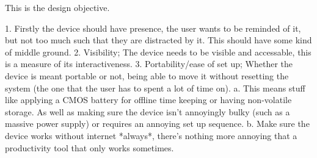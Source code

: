 This is the design objective.

1. Firstly the device should have presence, the user wants to be reminded of it, but not too much such that they are distracted by it. This should have some kind of middle ground.
2. Visibility; The device needs to be visible and accessable, this is a measure of its interactiveness.
3. Portability/ease of set up; Whether the device is meant portable or not, being able to move it without resetting the system (the one that the user has to spent a lot of time on).
    a. This means stuff like applying a CMOS battery for offline time keeping or having non-volatile storage. As well as making sure the device isn't annoyingly bulky (such as a massive power supply) or requires an annoying set up sequence.
    b. Make sure the device works without internet *always*, there's nothing more annoying that a productivity tool that only works sometimes.